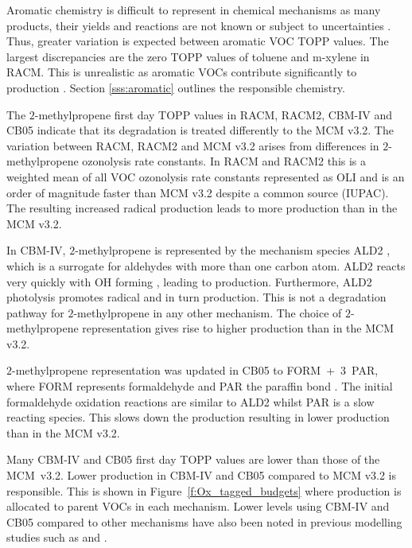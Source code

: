 Aromatic chemistry is difficult to represent in chemical mechanisms as many products, their yields and reactions are not known or subject to uncertainties \citep{Vereecken:2012}. 
Thus, greater variation is expected between aromatic VOC TOPP values.
The largest discrepancies are the zero TOPP values of toluene and m-xylene in RACM. 
This is unrealistic as aromatic VOCs contribute significantly to  production \citep{Derwent:1998}. 
Section \ref{sss:aromatic} outlines the responsible chemistry.

The $2$-methylpropene first day TOPP values in RACM, RACM2, CBM-IV and CB05 indicate that its degradation is treated differently to the MCM v3.2. 
The variation between RACM, RACM2 and MCM v3.2 arises from differences in $2$-methylpropene ozonolysis rate constants.
In RACM and RACM2 this is a weighted mean of all VOC ozonolysis rate constants represented as OLI \citep{Stockwell:1997, Goliff:2013} and is an order of magnitude faster than MCM v3.2 despite a common source (IUPAC).
The resulting increased radical production leads to more  production than in the MCM v3.2.

In CBM-IV, $2$-methylpropene is represented by the mechanism species ALD2 \citep{Hogo:1989}, which is a surrogate for aldehydes with more than one carbon atom. 
ALD2 reacts very quickly with OH forming , leading to  production. 
Furthermore, ALD2 photolysis promotes radical and in turn  production. 
This is not a degradation pathway for $2$-methylpropene in any other mechanism. 
The choice of $2$-methylpropene representation gives rise to higher  production than in the MCM v3.2.

$2$-methylpropene representation was updated in CB05 to \mbox{FORM + $3$ PAR}, where FORM represents formaldehyde and PAR the paraffin  bond \citep{Yarwood:2005}. 
The initial formaldehyde oxidation reactions are similar to ALD2 whilst PAR is a slow reacting species. 
This slows down the  production resulting in lower  production than in the MCM v3.2.

Many CBM-IV and CB05 first day TOPP values are lower than those of the \mbox{MCM v3.2}. 
Lower  production in CBM-IV and CB05 compared to MCM v3.2 is responsible.
This is shown in \mbox{Figure \ref{f:Ox_tagged_budgets}} where  production is allocated to parent VOCs in each mechanism.
Lower  levels using CBM-IV and CB05 compared to other mechanisms have also been noted in previous modelling studies such as \citet{Luecken:2008, Emmerson:2009} and \citet{Saylor:2012}.

